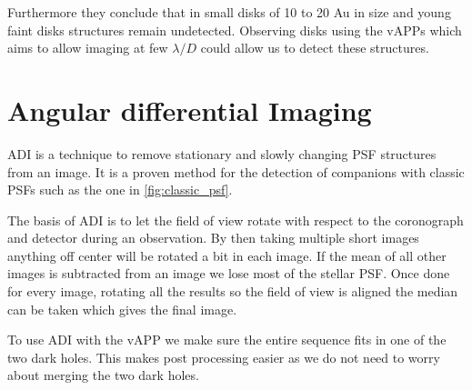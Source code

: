 Furthermore they \cite{garufi} conclude that in small disks of 10 to 20 Au in size and young faint disks structures remain undetected. Observing disks using the \acp{vAPP} which aims to allow imaging at few $\lambda/D$ could allow us to detect these structures.



\section{Angular differential Imaging}
\label{sec:adi}
\ac{ADI} \cite{marois_2005} is a technique to remove stationary and slowly changing PSF structures from an image. It is a proven method for the detection of companions with classic \acp{PSF} such as the one in \autoref{fig:classic_psf}. %

The basis of \ac{ADI} is to let the field of view rotate with respect to the coronograph and detector during an observation. By then taking multiple short images anything off center will be rotated a bit in each image. If the mean of all other images is subtracted from an image we lose most of the stellar \ac{PSF}. Once done for every image, rotating all the results so the field of view is aligned the median can be taken which gives the final image.

To use \ac{ADI} with the \ac{vAPP} we make sure the entire sequence fits in one of the two dark holes. This makes post processing easier as we do not need to worry about merging the two dark holes.
